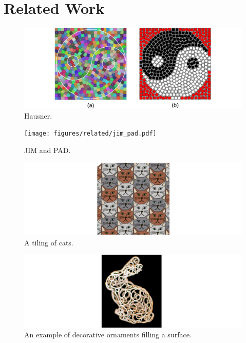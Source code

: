 
\chapter{Related Work}
\label{chapter_related_work}

\begin{figure}[ht!]
\centering
\includegraphics[width=1.0\textwidth]{figures/related/hausner.pdf} 
\caption[Decorative mosaics using Lloyd's method]
{\label{fig_related_hausner} 
Hausner. }
\end{figure}


\begin{figure}[t]
\centering
\texttt{[image: figures/related/jim\_pad.pdf]} 
\caption[Examples of packings generated by JIM and PAD]
{\label{fig_related_jim_pad} 
JIM and PAD. }
\end{figure}

\begin{figure}[t]
\centering
\includegraphics[width=1.0\textwidth]{figures/related/escherization.pdf} 
\caption[An example of a tiling]
{\label{fig_related_escherization} 
A tiling of cats. }
\end{figure}

\begin{figure}[t]
\centering
\includegraphics[width=1.0\textwidth]{figures/related/zehnder.pdf} 
\caption[An example of decorative ornaments filling a surface]
{\label{fig_related_zehnder} 
An example of decorative ornaments filling a surface.}
\end{figure}

